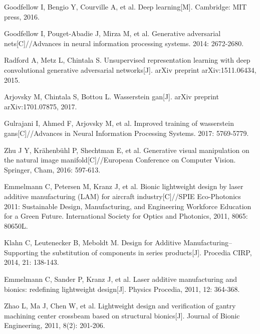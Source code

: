 \renewcommand{\baselinestretch}{1}

\begin{thebibliography}{plain}



Goodfellow I, Bengio Y, Courville A, et al. Deep learning[M]. Cambridge: MIT press, 2016.

Goodfellow I, Pouget-Abadie J, Mirza M, et al. Generative adversarial nets[C]//Advances in neural information processing systems. 2014: 2672-2680.

Radford A, Metz L, Chintala S. Unsupervised representation learning with deep convolutional generative adversarial networks[J]. arXiv preprint arXiv:1511.06434, 2015.

Arjovsky M, Chintala S, Bottou L. Wasserstein gan[J]. arXiv preprint arXiv:1701.07875, 2017.

Gulrajani I, Ahmed F, Arjovsky M, et al. Improved training of wasserstein gans[C]//Advances in Neural Information Processing Systems. 2017: 5769-5779.

Zhu J Y, Krähenbühl P, Shechtman E, et al. Generative visual manipulation on the natural image manifold[C]//European Conference on Computer Vision. Springer, Cham, 2016: 597-613.

Emmelmann C, Petersen M, Kranz J, et al. Bionic lightweight design by laser additive manufacturing (LAM) for aircraft industry[C]//SPIE Eco-Photonics 2011: Sustainable Design, Manufacturing, and Engineering Workforce Education for a Green Future. International Society for Optics and Photonics, 2011, 8065: 80650L.

Klahn C, Leutenecker B, Meboldt M. Design for Additive Manufacturing–Supporting the substitution of components in series products[J]. Procedia CIRP, 2014, 21: 138-143.

Emmelmann C, Sander P, Kranz J, et al. Laser additive manufacturing and bionics: redefining lightweight design[J]. Physics Procedia, 2011, 12: 364-368.

Zhao L, Ma J, Chen W, et al. Lightweight design and verification of gantry machining center crossbeam based on structural bionics[J]. Journal of Bionic Engineering, 2011, 8(2): 201-206.


\end{thebibliography}
